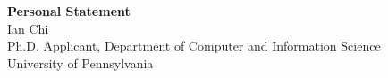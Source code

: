 \documentclass[11pt]{article}
\begin{document}
\begin{center}
    {\Large \textbf{Personal Statement}}\\[4pt]
    {\large Ian Chi}\\[2pt]
    Ph.D. Applicant, Department of Computer and Information Science\\
    University of Pennsylvania
\end{center}

\vspace{1em}

\end{document}

